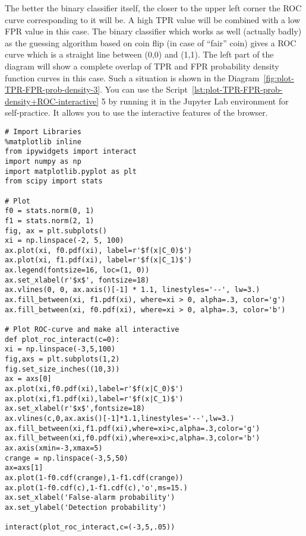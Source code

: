 \documentclass[]{scrreprt}
\begin{document}
The better the binary classifier itself, the closer to the upper left corner the ROC curve corresponding to it will be. A high TPR value will be combined with a low FPR value in this case. The binary classifier which works as well (actually badly) as the guessing algorithm based on coin flip  (in case of ``fair'' coin) gives a ROC curve which is a straight line between (0,0) and (1,1). The left part of the diagram will show a complete overlap of TPR and FPR probability density function curves in this case. Such a situation is shown in the Diagram~\ref{fig:plot-TPR-FPR-prob-density-3}. You can use the Script~\ref{lst:plot-TPR-FPR-prob-density+ROC-interactive} 5 by running it in the Jupyter Lab environment for self-practice. It allows you to use the interactive features of the browser.
%
\begin{lstlisting}[float=htp, caption = Build an~interactive graph of~TPR and FPR distribution density and its corresponding ROC curve for a given threshold value, firstnumber=1, label= lst:plot-TPR-FPR-prob-density+ROC-interactive]
# Import Libraries
%matplotlib inline
from ipywidgets import interact
import numpy as np
import matplotlib.pyplot as plt
from scipy import stats

# Plot
f0 = stats.norm(0, 1)
f1 = stats.norm(2, 1)
fig, ax = plt.subplots()
xi = np.linspace(-2, 5, 100)
ax.plot(xi, f0.pdf(xi), label=r'$f(x|C_0)$')
ax.plot(xi, f1.pdf(xi), label=r'$f(x|C_1)$')
ax.legend(fontsize=16, loc=(1, 0))
ax.set_xlabel(r'$x$', fontsize=18)
ax.vlines(0, 0, ax.axis()[-1] * 1.1, linestyles='--', lw=3.)
ax.fill_between(xi, f1.pdf(xi), where=xi > 0, alpha=.3, color='g')
ax.fill_between(xi, f0.pdf(xi), where=xi > 0, alpha=.3, color='b')

# Plot ROC-curve and make all interactive
def plot_roc_interact(c=0):
xi = np.linspace(-3,5,100)
fig,axs = plt.subplots(1,2)
fig.set_size_inches((10,3))
ax = axs[0]
ax.plot(xi,f0.pdf(xi),label=r'$f(x|C_0)$')
ax.plot(xi,f1.pdf(xi),label=r'$f(x|C_1)$')
ax.set_xlabel(r'$x$',fontsize=18)
ax.vlines(c,0,ax.axis()[-1]*1.1,linestyles='--',lw=3.)
ax.fill_between(xi,f1.pdf(xi),where=xi>c,alpha=.3,color='g')
ax.fill_between(xi,f0.pdf(xi),where=xi>c,alpha=.3,color='b')
ax.axis(xmin=-3,xmax=5)
crange = np.linspace(-3,5,50)
ax=axs[1]
ax.plot(1-f0.cdf(crange),1-f1.cdf(crange))
ax.plot(1-f0.cdf(c),1-f1.cdf(c),'o',ms=15.)
ax.set_xlabel('False-alarm probability')
ax.set_ylabel('Detection probability')

interact(plot_roc_interact,c=(-3,5,.05))

\end{lstlisting}
\end{document}
